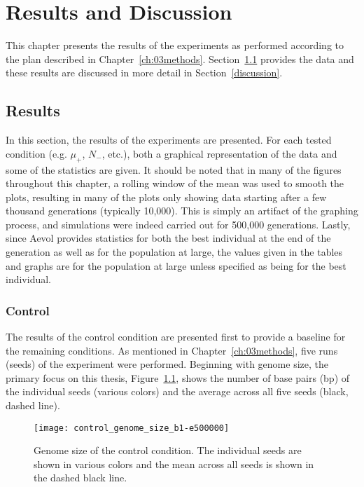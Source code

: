 \chapter{Results and Discussion}\label{ch:04results_discussion}

This chapter presents the results of the experiments as performed according to the plan described in Chapter~\ref{ch:03methods}. Section~\ref{results} provides the data and these results are discussed in more detail in Section~\ref{discussion}. 

\section{Results}\label{results}
In this section, the results of the experiments are presented. For each tested condition (e.g. $\mu_+$, $N_-$, etc.), both a graphical representation of the data and some of the statistics are given. It should be noted that in many of the figures throughout this chapter, a rolling window of the mean was used to smooth the plots, resulting in many of the plots only showing data starting after a few thousand generations (typically 10,000). This is simply an artifact of the graphing process, and simulations were indeed carried out for 500,000 generations. Lastly, since Aevol provides statistics for both the best individual at the end of the generation as well as for the population at large, the values given in the tables and graphs are for the population at large unless specified as being for the best individual. 
\subsection{Control}
The results of the control condition are presented first to provide a baseline for the remaining conditions. As mentioned in Chapter~\ref{ch:03methods}, five runs (seeds) of the experiment were performed. Beginning with genome size, the primary focus on this thesis, Figure~\ref{fig:control_genome_size}, shows the number of base pairs (bp) of the individual seeds (various colors) and the average across all five seeds (black, dashed line). 

\begin{figure}[H]
	\centering
	\texttt{[image: control\_genome\_size\_b1-e500000]}
	\caption[Control genome size, all seeds]{Genome size of the control condition. The individual seeds are shown in various colors and the mean across all seeds is shown in the dashed black line.}
	\label{fig:control_genome_size}
\end{figure}

